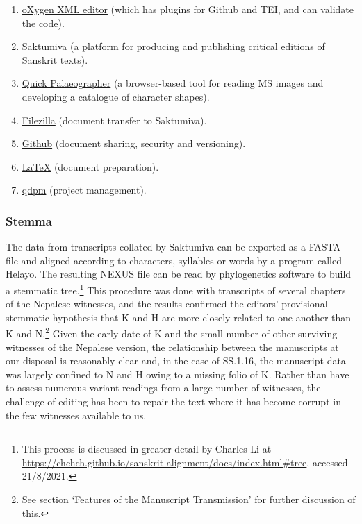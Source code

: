 \begin{enumerate}
    \item
    \href{https://www.oxygenxml.com.}{oXygen XML editor} (which has plugins for Github and TEI, and can validate the code).%
    
       \item
        \href{http://saktumiva.org.}{Saktumiva} (a platform for producing and publishing critical editions of Sanskrit texts).%
        \item
         \href{https://tst.hypotheses.org/1738.}{Quick Palaeographer} (a browser-based tool for reading MS images and developing a catalogue of character shapes).%

        \item
         \href{https://filezilla-project.org.}{Filezilla} (document transfer to Saktumiva).%
        \item
         \href{https://github.com.}{Github} (document sharing, security and versioning).%
        \item
          \href{https://www.latex-project.org.}{LaTeX} (document preparation).%
         \item
           \href{https://qdpm.net.}{qdpm} (project management).%
          
\end{enumerate}

\subsubsection{Stemma}
The data from transcripts collated by Saktumiva can be exported as a FASTA file 
and aligned according to characters, syllables or words by a program called 
Helayo. The resulting NEXUS file can be read by phylogenetics software to build a 
stemmatic tree.\footnote{This process is discussed in greater detail by Charles Li 
at \url{https://chchch.github.io/sanskrit-alignment/docs/index.html\#tree}, 
accessed 21/8/2021.} This procedure was done with transcripts of several 
chapters of the Nepalese witnesses, and the results confirmed the editors' provisional stemmatic hypothesis that 
K and H are more closely related to one another than K and N.\footnote{See 
section `Features of the Manuscript Transmission' for further discussion of this.} 
Given the early date of K and the small number of other surviving witnesses of the 
Nepalese version, the relationship between the manuscripts at our disposal is 
reasonably clear and, in the case of SS.1.16, the manuscript data was largely 
confined to N and H owing to a missing folio of K. Rather than have to assess numerous variant readings from a large number of witnesses, the challenge of editing has 
been to repair the text where it has become corrupt in the few witnesses available to us. 

